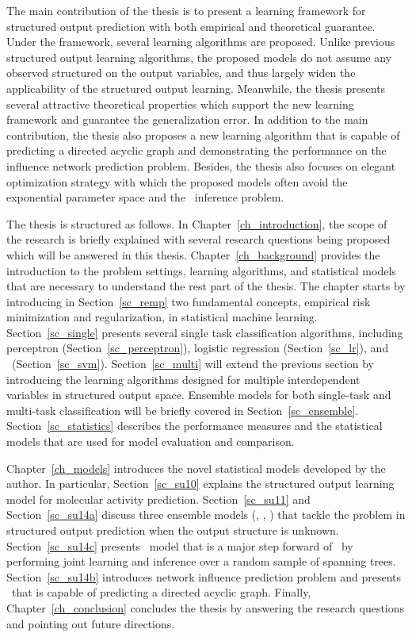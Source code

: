 The main contribution of the thesis is to present a learning framework for structured output prediction with both empirical and theoretical guarantee.
Under the framework, several learning algorithms are proposed.
Unlike previous structured output learning algorithms, the proposed models do not assume any observed structured on the output variables, and thus largely widen the applicability of the structured output learning.
Meanwhile, the thesis presents several attractive theoretical properties which support the new learning framework and guarantee the generalization error.
In addition to the main contribution, the thesis also proposes a new learning algorithm that is capable of predicting a directed acyclic graph and demonstrating the performance on the influence network prediction problem.
Besides, the thesis also focuses on elegant optimization strategy with which the proposed models often avoid the exponential parameter space and the \nphard\ inference problem.

The thesis is structured as follows.
In Chapter~\ref{ch_introduction}, the scope of the research is briefly explained with several research questions being proposed which will be answered in this thesis.
Chapter~\ref{ch_background} provides the introduction to the problem settings, learning algorithms, and statistical models that are necessary to understand the rest part of the thesis.
The chapter starts by introducing in Section~\ref{sc_remp} two fundamental concepts, empirical risk minimization and regularization, in statistical machine learning.
Section~\ref{sc_single} presents several single task classification algorithms, including 
perceptron (Section~\ref{sc_perceptron}), 
logistic regression (Section~\ref{sc_lr}), 
and \svm\ (Section~\ref{sc_svm}).
Section~\ref{sc_multi} will extend the previous section by introducing the learning algorithms designed for multiple interdependent variables in structured output space.
Ensemble models for both single-task and multi-task classification will be briefly covered in Section~\ref{sc_ensemble}.
Section~\ref{sc_statistics} describes the performance measures and the statistical models that are used for model evaluation and comparison.

Chapter~\ref{ch_models} introduces the novel statistical models developed by the author.
In particular, Section~\ref{sc_su10} explains the structured output learning model for molecular activity prediction.
Section~\ref{sc_su11} and Section~\ref{sc_su14a} discuss three ensemble models (\mve, \amm, \mam) that tackle the problem in structured output prediction when the output structure is unknown.
Section~\ref{sc_su14c} presents \rta\ model that is a major step forward of \mam\ by performing joint learning and inference over a random sample of spanning trees.
Section~\ref{sc_su14b} introduces network influence prediction problem and presents \spin\ that is capable of predicting a directed acyclic graph.
Finally, Chapter~\ref{ch_conclusion} concludes the thesis by answering the research questions and pointing out future directions.

